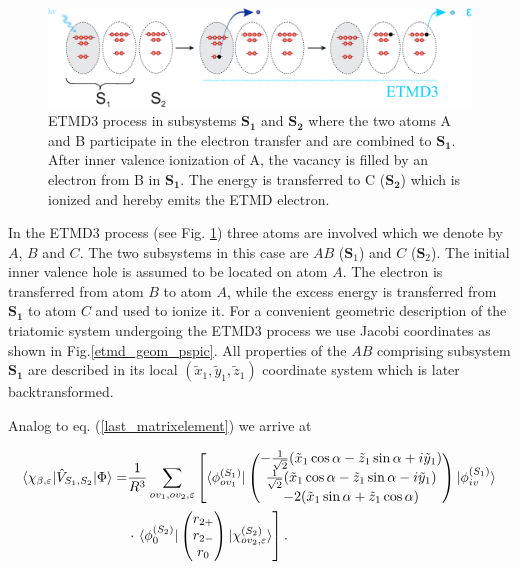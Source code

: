 \begin{figure}[ht]
\centering
\includegraphics[scale=0.30]{pics/ETMD_subsystems.eps}
\caption{ETMD3 process in subsystems $\mathbf{S_1}$ and $\mathbf{S_2}$ where
         the two atoms A and B participate in the electron transfer and are
         combined to $\mathbf{S_1}$. After inner valence ionization of A,
         the vacancy is filled by an electron from B in $\mathbf{S_1}$.
         The energy is transferred to C ($\mathbf{S_2}$) which is ionized
         and hereby emits the ETMD electron.}
\label{fancy_ETMD}
\end{figure}

In the ETMD3 process (see Fig. \ref{fancy_ETMD}) three atoms are involved
which we denote by $A$, $B$ and $C$. The two subsystems in this case are
$AB$ ($\mathbf{S}_1$) and $C$ ($\mathbf{S}_2$). The initial inner valence
hole is assumed to be located on atom $A$. The electron is transferred
from atom $B$ to atom $A$, while the excess energy is transferred from
$\mathbf{S_1}$ to atom $C$ and used to ionize it. For a convenient
geometric description of the triatomic system undergoing the ETMD3 process
we use Jacobi coordinates as shown in Fig.\ref{etmd_geom_pspic}. All
properties of the $AB$ comprising subsystem $\mathbf{S_1}$ are described in
its local $(\tilde{x}_1, \tilde{y}_1,  \tilde{z}_1)$ coordinate system which
is later backtransformed.

Analog to eq. (\ref{last_matrixelement}) we arrive at

\begin{align}\label{last_matrixelement_etmd}
 \braket{\chi_{\beta,\varepsilon}|\hat{V}_{S_1,S_2}|\Phi} 
=& \frac{1}{R^3} \sum\limits_{ov_1,ov_2,\varepsilon}  \left[
  \braket{\phi_{ov_1}^{(S_1)}|  \begin{pmatrix}
         -\frac{1}{\sqrt{2}}(\tilde{x}_1\cos\alpha- \tilde{z}_1\sin\alpha +i\tilde{y}_1)\\
         \frac{1}{\sqrt{2}}(\tilde{x}_1\cos\alpha- \tilde{z}_1\sin\alpha -i\tilde{y}_1)\\
         -2 (\tilde{x}_1\sin\alpha + \tilde{z}_1\cos\alpha )\\
         \end{pmatrix} |\phi_{iv}^{(S_1)}} \right. \nonumber \\
  & \cdot \left. \braket{\phi_{0}^{(S_2)}| \begin{pmatrix}
                            r_{2+}\\
                            r_{2-}\\
                            r_0\\
                            \end{pmatrix} |\chi_{ov_2,\varepsilon}^{(S_2)}} \right] .
\end{align}

